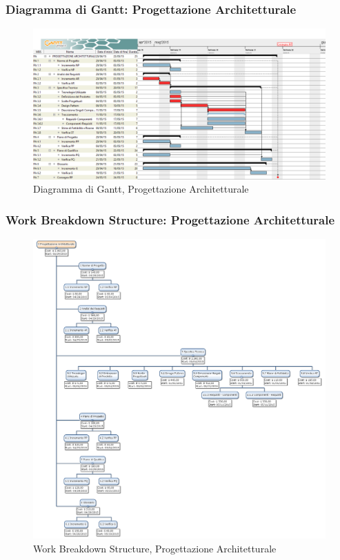 \subsubsection{Diagramma di Gantt: Progettazione Architetturale}
\begin{figure}[h] 
	\centering
	\includegraphics[width=\textwidth]{./img/progettazione_architetturale.png}
	\caption{Diagramma di Gantt, Progettazione Architetturale}
\end{figure}

\newpage
\subsubsection{Work Breakdown Structure: Progettazione Architetturale}
\begin{figure}[h]
	\centering
	\includegraphics[width=\textwidth]{./img/wbs_progettazione_architetturale.png}
	\caption{Work Breakdown Structure, Progettazione Architetturale}
\end{figure}

